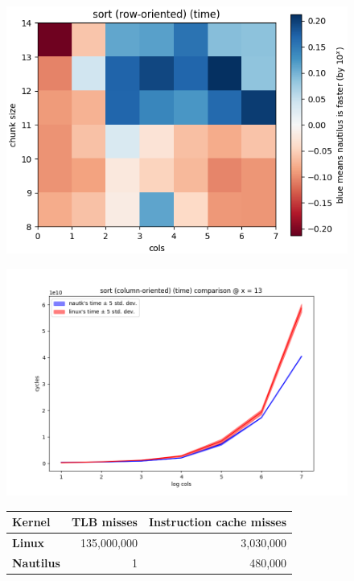 \documentclass[conference]{IEEEtran}
\begin{document}
\begin{figure}[t]
  \centering
  \begin{minipage}{0.32\linewidth}
    \centering
    \includegraphics[width=1\linewidth]{../plots/sort_2d.png}
    \label{fig:sort2d}
  \end{minipage}
  \begin{minipage}{0.32\linewidth}
    \centering
  \includegraphics[width=1\linewidth]{../plots/sort.png}
    \label{fig:colsort}
  \end{minipage}
  \begin{minipage}{0.32\linewidth}
    \centering
      \begin{tabular}{l || r | r }
        \textbf{Kernel}    & TLB misses  & Instruction cache misses \\
        \hline\hline
        \textbf{Linux}     & 135,000,000 & 3,030,000 \\
         \textbf{Nautilus} &           1 &   480,000 \\
      \end{tabular}


\end{minipage}
\end{figure}
\end{document}
